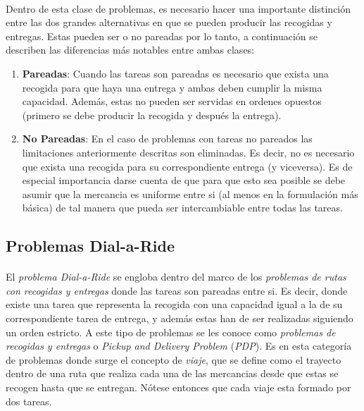 \documentclass{subfiles}
\begin{document}
        \paragraph{}
        Dentro de esta clase de problemas, es necesario hacer una importante distinción entre las dos grandes alternativas en que se pueden producir las recogidas y entregas. Estas pueden ser o no pareadas por lo tanto, a continuación se describen las diferencias más notables entre ambas clases:

        \begin{enumerate}
          \item \textbf{Pareadas}: Cuando las tareas son pareadas es necesario que exista una recogida para que haya una entrega y ambas deben cumplir la misma capacidad. Además, estas no pueden ser servidas en ordenes opuestos (primero se debe producir la recogida y después la entrega).
          \item \textbf{No Pareadas}: En el caso de problemas con tareas no pareados las limitaciones anteriormente descritas son eliminadas. Es decir, no es necesario que exista una recogida para su correspondiente entrega (y viceversa). Es de especial importancia darse cuenta de que para que esto sea posible se debe asumir que la mercancia es uniforme entre si (al menos en la formulación más básica) de tal manera que pueda ser intercambiable entre todas las tareas.
        \end{enumerate}

      \subsection{Problemas Dial-a-Ride}
      \label{sec:formulation_dial_a_ride_problems}

        \paragraph{}
        El \emph{problema Dial-a-Ride} se engloba dentro del marco de los \emph{problemas de rutas con recogidas y entregas} donde las tareas son pareadas entre si. Es decir, donde existe una tarea que representa la recogida con una capacidad igual a la de su correspondiente tarea de entrega, y además estas han de ser realizadas siguiendo un orden estricto. A este tipo de problemas se les conoce como \emph{problemas de recogidas y entregas} o \emph{Pickup and Delivery Problem} (\emph{PDP}). Es en esta categoría de problemas donde surge el concepto de \emph{viaje}, que se define como el trayecto dentro de una ruta que realiza cada una de las mercancias desde que estas se recogen hasta que se entregan. Nótese entonces que cada viaje esta formado por dos tareas.
\end{document}

